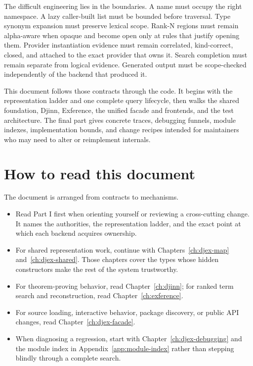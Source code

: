 \documentclass[10pt,letterpaper,oneside]{report}
\begin{document}
The difficult engineering lies in the boundaries. A name must occupy the right namespace. A lazy caller-built list must be bounded before traversal. Type synonym expansion must preserve lexical scope. Rank-N regions must remain alpha-aware when opaque and become open only at rules that justify opening them. Provider instantiation evidence must remain correlated, kind-correct, closed, and attached to the exact provider that owns it. Search completion must remain separate from logical evidence. Generated output must be scope-checked independently of the backend that produced it.

This document follows those contracts through the code. It begins with the representation ladder and one complete query lifecycle, then walks the shared foundation, Djinn, Exference, the unified facade and frontends, and the test architecture. The final part gives concrete traces, debugging funnels, module indexes, implementation bounds, and change recipes intended for maintainers who may need to alter or reimplement internals.

\tableofcontents
\clearpage
{}

\chapter*{How to read this document}

The document is arranged from contracts to mechanisms.

\begin{itemize}
  \item Read Part I first when orienting yourself or reviewing a cross-cutting change. It names the authorities, the representation ladder, and the exact point at which each backend acquires ownership.
  \item For shared representation work, continue with Chapters~\ref{ch:djex-map} and~\ref{ch:djex-shared}. Those chapters cover the types whose hidden constructors make the rest of the system trustworthy.
  \item For theorem-proving behavior, read Chapter~\ref{ch:djinn}; for ranked term search and reconstruction, read Chapter~\ref{ch:exference}.
  \item For source loading, interactive behavior, package discovery, or public API changes, read Chapter~\ref{ch:djex-facade}.
  \item When diagnosing a regression, start with Chapter~\ref{ch:djex-debugging} and the module index in Appendix~\ref{app:module-index} rather than stepping blindly through a complete search.
\end{itemize}
\end{document}
